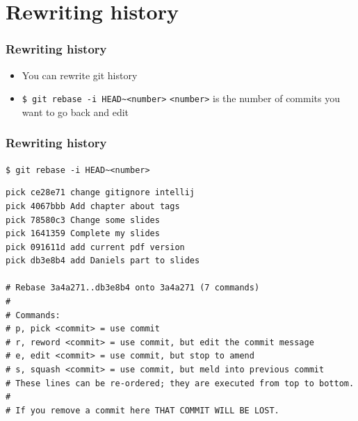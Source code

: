 \documentclass{beamer}
\begin{document}
	\section{Rewriting history}
	\begin{frame}
		\frametitle{Rewriting history}\pause
		\begin{itemize}
			\item You can rewrite git history\pause\newline
			\item \lstinline|$ git rebase -i HEAD~<number>|\newline
			\lstinline|<number>| is the number of commits you want to go back and edit
		\end{itemize}
	\end{frame}
	
	\begin{frame}[fragile]
		\frametitle{Rewriting history}\pause
		\lstinline|$ git rebase -i HEAD~<number>|\newline
		\begin{lstlisting}[basicstyle=\tiny]
pick ce28e71 change gitignore intellij
pick 4067bbb Add chapter about tags
pick 78580c3 Change some slides
pick 1641359 Complete my slides
pick 091611d add current pdf version
pick db3e8b4 add Daniels part to slides

# Rebase 3a4a271..db3e8b4 onto 3a4a271 (7 commands)
#
# Commands:
# p, pick <commit> = use commit
# r, reword <commit> = use commit, but edit the commit message
# e, edit <commit> = use commit, but stop to amend
# s, squash <commit> = use commit, but meld into previous commit
# These lines can be re-ordered; they are executed from top to bottom.                                                           
#
# If you remove a commit here THAT COMMIT WILL BE LOST.
		\end{lstlisting}
	\end{frame}
	
\end{document}
